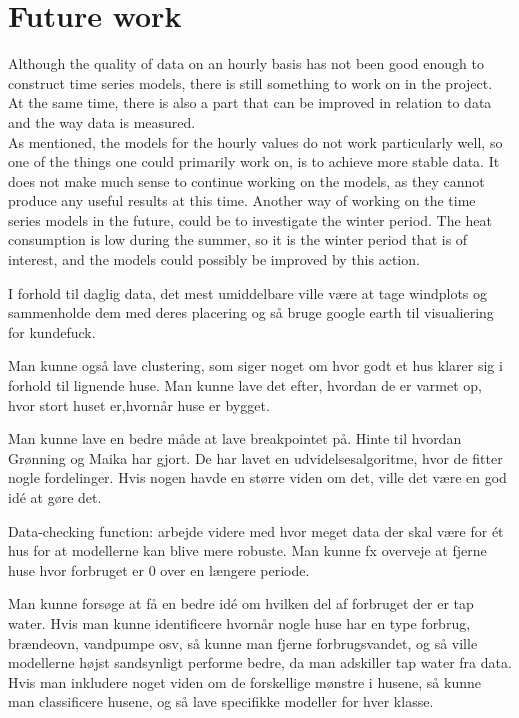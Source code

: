 \section{Future work}
Although the quality of data on an hourly basis has not been good enough to construct time series models, there is still something to work on in the project. At the same time, there is also a part that can be improved in relation to data and the way data is measured. \\

\noindent As mentioned, the models for the hourly values do not ​​work particularly well, so one of the things one could primarily work on, is to achieve more stable data. It does not make much sense to continue working on the models, as they cannot produce any useful results at this time. Another way of working on the time series models in the future, could be to investigate the winter period. The heat consumption is low during the summer, so it is the winter period that is of interest, and the models could possibly be improved by this action.

I forhold til daglig data, det mest umiddelbare ville være at tage windplots og sammenholde dem med deres placering og så bruge google earth til visualiering for kundefuck. 

Man kunne også lave clustering, som siger noget om hvor godt et hus klarer sig i forhold til lignende huse. Man kunne lave det efter, hvordan de er varmet op, hvor stort huset er,hvornår huse er bygget. 

Man kunne lave en bedre måde at lave breakpointet på. Hinte til hvordan Grønning og Maika har gjort. De har lavet en udvidelsesalgoritme, hvor de fitter nogle fordelinger. Hvis nogen havde en større viden om det, ville det være en god idé at gøre det.

Data-checking function: arbejde videre med hvor meget data der skal være for ét hus for at modellerne kan blive mere robuste. Man kunne fx overveje at fjerne huse hvor forbruget er 0 over en længere periode. 

Man kunne forsøge at få en bedre idé om hvilken del af forbruget der er tap water. Hvis man kunne identificere hvornår nogle huse har en type forbrug, brændeovn, vandpumpe osv, så kunne man fjerne forbrugsvandet, og så ville modellerne højst sandsynligt performe bedre, da man adskiller tap water fra data. Hvis man inkludere noget viden om de forskellige mønstre i husene, så kunne man classificere husene, og så lave specifikke modeller for hver klasse. 